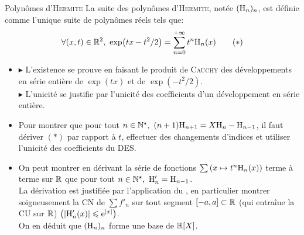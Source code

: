\begin{defi}{Polynômes d'\textsc{Hermite}}
    La suite des polynômes d'\textsc{Hermite}, notée $(\mathrm{H}_n)_n$, est définie comme l'unique suite de polynômes réels tels que:
    $$\forall(x, t) \in \mathbb{R}^2,\ \exp(tx-t^2/2) = \sum_{n=0}^{+\infty} t^n \mathrm{H}_n(x) \qquad (*)$$
\end{defi}

\begin{preuve}
    \begin{itemize}
    \item $\blacktriangleright$ L'existence se prouve en faisant le produit de \textsc{Cauchy} des développements en série entière de $\exp(tx)$ et de $\exp(-t^2/2)$.\\
    $\blacktriangleright$ L'unicité se justifie par l'unicité des coefficients d'un développement en série entière. 
    \item Pour montrer que pour tout $n \in \Ne,\ (n+1)\Hermite_{n+1}=X\Hermite_n-\Hermite_{n-1}$, il faut dériver $(*)$ par rapport à $t$, effectuer des changements d'indices et utiliser l'unicité des coefficients du DES. 
    \item On peut montrer en dérivant  la série de fonctions $\sum \left(x \mapsto t^n \mathrm{H}_n(x) \right)$ terme à terme sur $\mathbb{R}$ que pour tout $n \in \Ne,\ \Hermite'_n=\Hermite_{n-1}$.\\
    La dérivation est justifiée par l'application du , en particulier montrer soigneusement la CN de $\sum f'_n$ sur tout segment $[-a, a] \subset \mathbb{R}$ (qui entraîne la CU sur $\mathbb{R}$) $\left(|\mathrm{H}'_n(x)| \leqslant \mathrm{e}^{|x|} \right)$.\\
    On en déduit que $(\mathrm{H}_n)_n$ forme une base de $\mathbb{R}[X]$.\\
    \end{itemize}
\end{preuve}

